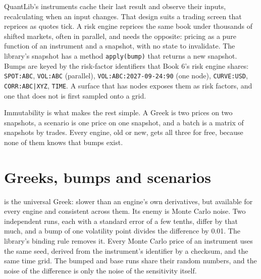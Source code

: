 QuantLib's instruments cache their last result and observe their inputs, recalculating when an input changes. That design suits a trading screen that
reprices as quotes tick. A risk engine reprices the same book under thousands of shifted markets, often in parallel, and needs the opposite: pricing as a
pure function of an instrument and a snapshot, with no state to invalidate. The library's snapshot has a method \texttt{apply(bump)} that returns a new
snapshot. Bumps are keyed by the risk-factor identifiers that Book 6's risk engine shares: \texttt{SPOT:ABC}, \texttt{VOL:ABC} (parallel),
\texttt{VOL:ABC:2027-09-24:90} (one node), \texttt{CURVE:USD}, \texttt{CORR:ABC|XYZ}, \texttt{TIME}. A surface that has nodes exposes them as risk factors,
and one that does not is first sampled onto a grid.

Immutability is what makes the rest simple. A Greek is two prices on two snapshots, a scenario is one price on one snapshot, and a batch is a matrix of
snapshots by trades. Every engine, old or new, gets all three for free, because none of them knows that bumps exist.

\section{Greeks, bumps and scenarios}

 is the universal Greek: slower than an engine's own derivatives, but available for every engine and consistent across them. Its enemy
is Monte Carlo noise. Two independent runs, each with a standard error of a few tenths, differ by that much, and a bump of one volatility point divides
the difference by 0.01. The library's binding rule removes it. Every Monte Carlo price of an instrument uses the same seed, derived from the
instrument's identifier by a checksum, and the same time grid. The bumped and base runs share their random numbers, and the noise of the difference is
only the noise of the sensitivity itself.

